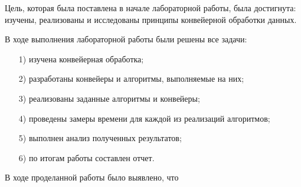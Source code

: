 Цель, которая была поставлена в начале лабораторной работы, была достигнута: изучены, реализованы и исследованы принципы конвейерной обработки данных.

В ходе выполнения лабораторной работы были решены все задачи:
\begin{enumerate}
	\item[1)] изучена конвейерная обработка;
	\item[2)] разработаны конвейеры и алгоритмы, выполняемые на них;
	\item[3)] реализованы заданные алгоритмы и конвейеры;
	\item[4)] проведены замеры времени для каждой из реализаций алгоритмов;
	\item[5)] выполнен анализ полученных результатов;
	\item[6)] по итогам работы составлен отчет.
\end{enumerate}

В ходе проделанной работы было выявлено, что 